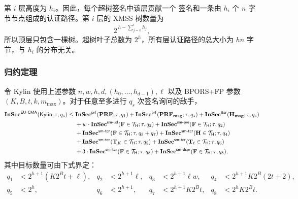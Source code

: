 第 $i$ 层高度为 $h_i$。因此，每个超树签名中该层贡献一个 \WOTSCS 签名和一条由 $h_i$ 个 $n$ 字节节点组成的认证路径。第 $i$ 层的 XMSS 树数量为
\[
    2^{\,h-\sum_{j=0}^{i}h_j},
\]
所以顶层只包含一棵树。超树叶子总数为 $2^h$，所有层认证路径的总大小为 $hn$ 字节，与 $h_i$ 的分布无关。

\subsubsection{归约定理}
\label{sec:proof-kylin-reduction}

\begin{theorem}
\label{thm:proof-kylin}
令 Kylin 使用上述参数 $n,w,h,d,(h_0,\ldots,h_{d-1}),\ell$ 以及 BPORS+FP 参数 $(K,B,t,k,m_{\max})$。对于任意至多进行 $q_s$ 次签名询问的敌手，
\begin{align}
\mathbf{InSec}^{\mathsf{EU\text{-}CMA}}(\mathsf{Kylin};\tau,q_s)
\le{}&
    \mathbf{InSec}^{\mathsf{prf}}(\mathbf{PRF};\tau,q_1)
    +\mathbf{InSec}^{\mathsf{prf}}(\mathbf{PRF_{msg}};\tau,q_s)
    +\mathbf{InSec}^{\mathsf{itsr}}(\mathbf{H_{msg}};\tau,q_s) \notag\\
&   +w\cdot\mathbf{InSec}^{\mathsf{sm\text{-}ud}}(\mathbf{F}\in\mathcal{T}_{\mathsf{H}};\tau,q_2)
    +\mathbf{InSec}^{\mathsf{sm\text{-}pre}}(\mathbf{F}\in\mathcal{T}_{\mathsf{H}};\tau,q_2) \notag\\
&   +\mathbf{InSec}^{\mathsf{sm\text{-}tcr}}(\mathbf{F}\in\mathcal{T}_{\mathsf{H}};\tau,q_3+q_7)
    +\mathbf{InSec}^{\mathsf{sm\text{-}tcr}}(\mathbf{H}\in\mathcal{T}_{\mathsf{H}};\tau,q_4) \notag\\
&   +\mathbf{InSec}^{\mathsf{sm\text{-}tcr}}(\mathbf{T}_K\in\mathcal{T}_{\mathsf{H}};\tau,q_5)
    +\mathbf{InSec}^{\mathsf{sm\text{-}tcr}}(\mathbf{T}_\ell\in\mathcal{T}_{\mathsf{H}};\tau,q_6) \notag\\
&   +3\cdot\mathbf{InSec}^{\mathsf{sm\text{-}tcr}}(\mathbf{F}\in\mathcal{T}_{\mathsf{H}};\tau,q_8)
    +\mathbf{InSec}^{\mathsf{sm\text{-}dspr}}(\mathbf{F}\in\mathcal{T}_{\mathsf{H}};\tau,q_8),
\label{eq:proof-kylin-bound}
\end{align}
其中目标数量可由下式界定：
\begin{align*}
q_1 &< 2^{h+1}(K2^B t+\ell),&
q_2 &< 2^{h+1}\ell,&
q_3 &< 2^{h+1}\ell w,&
q_4 &< 2^{h+1}K2^B(2t+2),\\
q_5 &< 2^h,&
q_6 &< 2^{h+1},&
q_7 &< 2^{h+1}K2^B t,&
q_8 &< 2^hK2^B t.
\end{align*}
\end{theorem}

